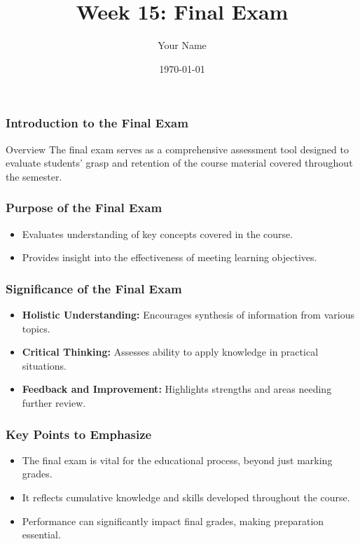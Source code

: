 \documentclass{beamer}
\title{Week 15: Final Exam}
\author{Your Name}
\institute{Your Institution}
\date{\today}
\begin{document}
\frame{\titlepage}

\begin{frame}[fragile]
    \frametitle{Introduction to the Final Exam}
    \begin{block}{Overview}
        The final exam serves as a comprehensive assessment tool designed to evaluate students’ grasp and retention of the course material covered throughout the semester.
    \end{block}
\end{frame}

\begin{frame}[fragile]
    \frametitle{Purpose of the Final Exam}
    \begin{itemize}
        \item Evaluates understanding of key concepts covered in the course.
        \item Provides insight into the effectiveness of meeting learning objectives.
    \end{itemize}
\end{frame}

\begin{frame}[fragile]
    \frametitle{Significance of the Final Exam}
    \begin{itemize}
        \item \textbf{Holistic Understanding:} 
            Encourages synthesis of information from various topics.
        
        \item \textbf{Critical Thinking:} 
            Assesses ability to apply knowledge in practical situations.

        \item \textbf{Feedback and Improvement:}
            Highlights strengths and areas needing further review.
    \end{itemize}
\end{frame}

\begin{frame}[fragile]
    \frametitle{Key Points to Emphasize}
    \begin{itemize}
        \item The final exam is vital for the educational process, beyond just marking grades.
        \item It reflects cumulative knowledge and skills developed throughout the course.
        \item Performance can significantly impact final grades, making preparation essential.
    \end{itemize}
\end{frame}
\end{document}
